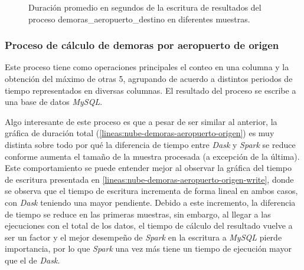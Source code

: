 \begin{figure}
\centering
{}
\caption{Duración promedio en segundos de la escritura de resultados del proceso demoras\_aeropuerto\_destino en diferentes muestras.}
\label{lineas:nube-demoras-aeropuerto-destino-write}
\end{figure}

\subsubsection{Proceso de cálculo de demoras por aeropuerto de origen}

Este proceso tiene como operaciones principales el conteo en una columna y la obtención del máximo de otras 5, agrupando de acuerdo a distintos periodos de tiempo representados en diversas columnas. El resultado del proceso se escribe a una base de datos \textit{MySQL}.

Algo interesante de este proceso es que a pesar de ser similar al anterior, la gráfica de duración total (\ref{lineas:nube-demoras-aeropuerto-origen}) es muy distinta sobre todo por qué la diferencia de tiempo entre \textit{Dask} y \textit{Spark} se reduce conforme aumenta el tamaño de la muestra procesada (a excepción de la última). Este comportamiento se puede entender mejor al observar la gráfica del tiempo de escritura presentada en \ref{lineas:nube-demoras-aeropuerto-origen-write}, donde se observa que el tiempo de escritura incrementa de forma lineal en ambos casos, con \textit{Dask} teniendo una mayor pendiente. Debido a este incremento, la diferencia de tiempo se reduce en las primeras muestras, sin embargo, al llegar a las ejecuciones con el total de los datos, el tiempo de cálculo del resultado vuelve a ser un factor y el mejor desempeño de \textit{Spark} en la escritura a \textit{MySQL} pierde importancia, por lo que \textit{Spark} una vez más tiene un tiempo de ejecución mayor que el de \textit{Dask}. 


